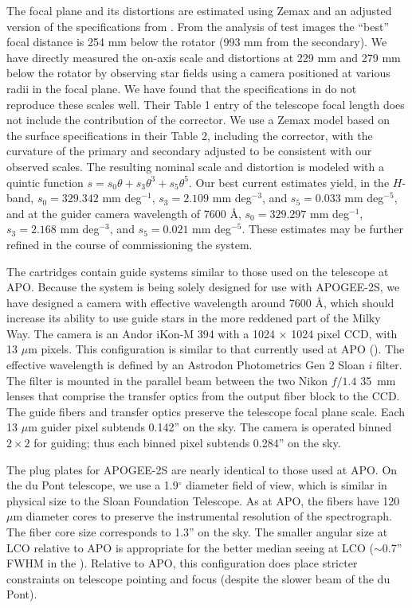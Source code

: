 The focal plane and its distortions are estimated using Zemax and an
adjusted version of the specifications from \citet{bowen73a}. From the
analysis of test images the ``best'' focal distance is 254 mm below
the rotator (993 mm from the secondary). We have directly measured the
on-axis scale and distortions at 229 mm and 279 mm below the
rotator by observing star fields using a camera positioned at various
radii in the focal plane. We have found that the specifications
in \citet{bowen73a} do not reproduce these scales well. Their Table 1
entry of the telescope focal length does not include the contribution
of the corrector.  We use a Zemax model based on the surface
specifications in their Table 2, including the corrector, with the
curvature of the primary and secondary adjusted to be consistent with
our observed scales. The resulting nominal scale and distortion is
modeled with a quintic function $s = s_0 \theta + s_3\theta^3 +
s_5\theta^5$. Our best current estimates yield, in the $H$-band, $s_0
= 329.342$ mm deg$^{-1}$, $s_3 = 2.109$ mm deg$^{-3}$, and $s_5 =
0.033$ mm deg$^{-5}$, and at the guider camera wavelength of 7600 \AA,
$s_0 = 329.297$ mm deg$^{-1}$, $s_3 = 2.168$ mm deg$^{-3}$, and $s_5 =
0.021$ mm deg$^{-5}$.  These estimates may be further refined in the
course of commissioning the system.

The cartridges contain guide systems similar to those used on the
telescope at APO. Because the system is being solely designed for use
with APOGEE-2S, we have designed a camera with effective wavelength
around 7600 \AA, which should increase its ability to use guide stars
in the more reddened part of the Milky Way.  The camera is an Andor
iKon-M 394 with a 1024 $\times$ 1024 pixel CCD, with 13 $\mu$m
pixels. This configuration is similar to that currently used at APO
(\citealt{smee13a}).  The effective wavelength is defined by an
Astrodon Photometrics Gen 2 Sloan $i$ filter. The filter is mounted in
the parallel beam between the two Nikon $f/1.4$ 35~mm lenses that
comprise the transfer optics from the output fiber block to the CCD.
The guide fibers and transfer optics preserve the telescope focal
plane scale.  Each 13 $\mu$m guider pixel subtends 0.142'' on the
sky.  The camera is operated binned $2\times2$ for guiding; thus each binned
pixel subtends 0.284'' on the sky.

The plug plates for APOGEE-2S are nearly identical to those used at
APO.  On the du Pont telescope, we use a 1.9$^\circ$ diameter field of
view, which is similar in physical size to the Sloan Foundation
Telescope. As at APO, the fibers have 120 $\mu$m diameter cores to
preserve the instrumental resolution of the spectrograph.  The fiber
core size corresponds to 1.3'' on the sky. The smaller angular size at
LCO relative to APO is appropriate for the better median seeing at LCO
($\sim$0.7'' FWHM in the
\Hband). Relative to APO, this configuration does place stricter
constraints on telescope pointing and focus (despite the slower beam of
the du Pont).

